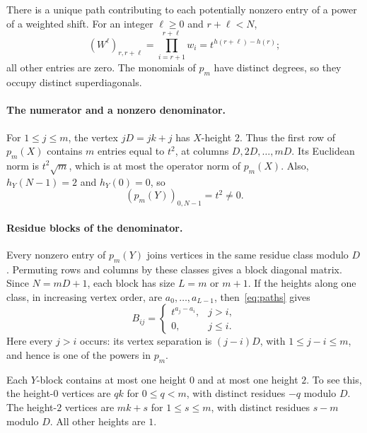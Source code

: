 \documentclass[11pt,a4paper]{article}
\begin{document}
There is a unique path contributing to each potentially nonzero entry of
a power of a weighted shift. For an integer $\ell\ge0$ and $r+\ell<N$,
\begin{equation}\label{eq:paths}
 (W^\ell)_{r,r+\ell}
 =\prod_{i=r+1}^{r+\ell}w_i=t^{h(r+\ell)-h(r)};
\end{equation}
all other entries are zero. The monomials of $p_m$ have distinct degrees,
so they occupy distinct superdiagonals.

\paragraph{The numerator and a nonzero denominator.}
For $1\le j\le m$, the vertex $jD=jk+j$ has $X$-height $2$.
Thus the first row of $p_m(X)$ contains $m$ entries equal to $t^2$, at
columns $D,2D,\ldots,mD$. Its Euclidean norm is $t^2\sqrt m$, which is
at most the operator norm of $p_m(X)$.
Also, $h_Y(N-1)=2$ and $h_Y(0)=0$, so
\begin{equation}\label{eq:nonzero}
 (p_m(Y))_{0,N-1}=t^2\ne0.
\end{equation}

\paragraph{Residue blocks of the denominator.}
Every nonzero entry of $p_m(Y)$ joins vertices in the same residue class
modulo $D$. Permuting rows and columns by these classes gives a block
diagonal matrix. Since $N=mD+1$, each block has size $L=m$ or $m+1$.
If the heights along one class, in increasing vertex order, are
$a_0,\ldots,a_{L-1}$, then~\eqref{eq:paths} gives
\begin{equation}\label{eq:block}
 B_{ij}=\begin{cases}t^{a_j-a_i},&j>i,\\0,&j\le i.\end{cases}
\end{equation}
Here every $j>i$ occurs: its vertex separation is $(j-i)D$, with
$1\le j-i\le m$, and hence is one of the powers in $p_m$.

Each $Y$-block contains at most one height $0$ and at most one height $2$.
To see this, the height-$0$ vertices are $qk$ for $0\le q<m$, with distinct
residues $-q$ modulo $D$. The height-$2$ vertices are $mk+s$ for
$1\le s\le m$, with distinct residues $s-m$ modulo $D$.
All other heights are $1$.
\end{document}
